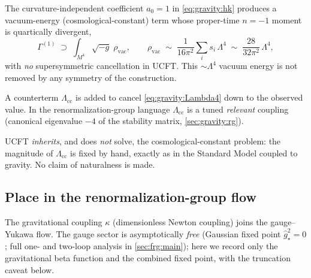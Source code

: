 The curvature-independent coefficient $a_{0}=1$ in \eqref{eq:gravity:hk}
produces a vacuum-energy (cosmological-constant) term whose proper-time
$n=-1$ moment is quartically divergent,
\begin{equation}\label{eq:gravity:Lambda4}
  \Gamma^{(1)} \;\supset\;
  \int_{M^{4}}\!\sqrt{-g}\;\rho_{\mathrm{vac}},
  \qquad
  \rho_{\mathrm{vac}}
  \;\sim\;
  \frac{1}{16\pi^{2}}\sum_{i} s_{i}\,\Lambda^{4}
  \;\sim\;
  \frac{28}{32\pi^{2}}\,\Lambda^{4},
\end{equation}
with \emph{no} supersymmetric cancellation in UCFT. This $\sim\Lambda^{4}$
vacuum energy is not removed by any symmetry of the construction.

\begin{postulate}
\label{post:gravity:cc}
A counterterm $\Lambda_{\mathrm{cc}}$ is added to cancel
\eqref{eq:gravity:Lambda4} down to the observed value. In the
renormalization-group language $\Lambda_{\mathrm{cc}}$ is a tuned
\emph{relevant} coupling (canonical eigenvalue $-4$ of the stability matrix,
\autoref{sec:gravity:rg}).
\end{postulate}

\begin{remark}[Status]
\label{rmk:gravity:ccstatus}
UCFT \emph{inherits}, and does \emph{not} solve, the cosmological-constant
problem: the magnitude of $\Lambda_{\mathrm{cc}}$ is fixed by hand, exactly
as in the Standard Model coupled to gravity. No claim of naturalness is
made.
\end{remark}

\subsection{Place in the renormalization-group flow}
\label{sec:gravity:rg}
\label{sec:gravity:stability}

The gravitational coupling $\kappa$ (dimensionless Newton coupling) joins
the gauge--Yukawa flow. The gauge sector is asymptotically \emph{free}
(Gaussian fixed point $\hat g^{2}_{\star}=0$; full one- and two-loop
analysis in \autoref{sec:frg:main}); here we record only the gravitational
beta function and the combined fixed point, with the truncation caveat below.

